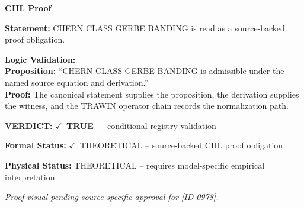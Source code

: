 \vspace{0.45em}
\noindent\textbf{CHL Proof}\par
\textbf{Statement:} CHERN CLASS GERBE BANDING is read as a source-backed proof obligation.

\textbf{Logic Validation:}\\
\textbf{Proposition:} ``CHERN CLASS GERBE BANDING is admissible under the named source equation and derivation.''\\
\textbf{Proof:} The canonical statement supplies the proposition, the derivation supplies the witness, and the TRAWIN operator chain records the normalization path.

\textbf{VERDICT:} \ensuremath{\checkmark}\ \textbf{TRUE} --- conditional registry validation

\textbf{Formal Status:} \ensuremath{\checkmark}\ THEORETICAL -- source-backed CHL proof obligation

\textbf{Physical Status:} THEORETICAL -- requires model-specific empirical interpretation
\par\vspace{0.45em}
\par
\vfill
\begingroup\footnotesize\itshape
Proof visual pending source-specific approval for [ID 0978].
\par\endgroup
\vfill
\endgroup
\endgroup
